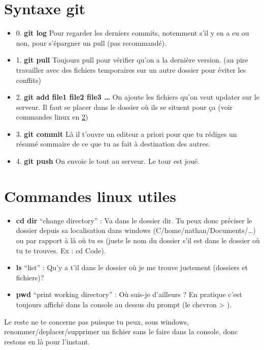\documentclass[a4paper,11pt,titlepage]{article}
\begin{document}
\section{Syntaxe git}
\begin{itemize}
	\item 0. \textbf{git log} Pour regarder les derniers commits, notemment s'il y en a eu ou non, pour s'épargner un pull (pas recommandé).
	\item 1. \textbf{git pull} Toujours pull pour vérifier qu'on a la dernière version. (au pire travailler avec des fichiers temporaires sur un autre dossier pour éviter les conflits)
	\item 2. \textbf{git add file1 file2 file3 \dots} On ajoute les fichiers qu'on veut updater sur le serveur. Il faut se placer dans le dossier où ils se situent pour ça (voir commandes linux en \ref{linux})
	\item 3. \textbf{git commit} Là il t'ouvre un editeur a priori pour que tu rédiges un résumé sommaire de ce que tu as fait à destination des autres.
	\item 4. \textbf{git push} On envoie le tout au serveur. Le tour est joué.
\end{itemize}

\section{Commandes linux utiles}
\label{linux}
\begin{itemize}
	\item \textbf{cd dir} ``change directory'' : Va dans le dossier dir. Tu peux donc préciser le dossier depuis sa localisation dans windows (C/home/nathan/Documents/\dots) ou par rapport à là où tu es (juste le nom du dossier s'il est dans le dossier où tu te trouves. Ex : cd Code).
	\item \textbf{ls} ``list'' : Qu'y a t'il dans le dossier où je me trouve justement (dossiers et fichiers)?
	\item \textbf{pwd} ``print working directory'' : Où suis-je d'ailleurs ? En pratique c'est toujours affiché dans la console au dessus du prompt (le chevron > ).
\end{itemize}
Le reste ne te concerne pas puisque tu peux, sous windows, renommer/deplacer/supprimer un fichier sans le faire dans la console, donc restons en là pour l'instant.
\end{document}

